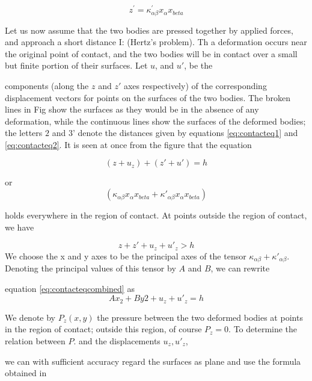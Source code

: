 \begin{equation}
z^{'} = \kappa^{'}_{\alpha\beta}x_{\alpha}x_{beta}
\label{eq:contacteq2}
\end{equation}

Let us now assume that the two bodies are pressed together by applied
forces, and approach a short distance I: (Hertz’s problem). Th a deformation occurs near the original point of contact, and the two bodies will be in contact over a small but finite portion of their surfaces. Let $u$, and $u'$, be the

components (along the $z$ and $z'$ axes respectively) of the corresponding displacement vectors for points on the surfaces of the two bodies. The broken lines in Fig show the surfaces as they would be in the absence of any deformation, while the continuous lines show the surfaces of the deformed bodies; the letters $2$ and $3’$ denote the distances given by equations \ref{eq:contacteq1}
and \ref{eq:contacteq2}. It is seen at once from the figure that the equation

\begin{equation}
(z+u_{z}) + (z'+u') = h
\end{equation}

or 
\begin{equation}
(\kappa_{\alpha\beta}x_{\alpha}x_{beta} + \kappa'_{\alpha\beta}x_{\alpha}x_{beta})
\label{eq:contacteqcombined}
\end{equation}

holds everywhere in the region of contact. At points outside the region of
contact, we have

\begin{equation}
z+z'+u_{z}+u'_{z} > h
\end{equation}
We choose the x and y axes to be the principal axes of the tensor $\kappa_{\alpha\beta}+\kappa'_{\alpha\beta}$. Denoting the principal values of this tensor by $A$ and $B$, we can rewrite


equation \ref{eq:contacteqcombined} as
\begin{equation}
Ax_{2}+By{2}+u_{z}+u'_{z} = h
\label{eq:rewriteAB}
\end{equation}

We denote by $P_{z}(x,y)$ the pressure between the two deformed bodies at points in the region of contact; outside this region, of course $P_{z} = 0$. To determine the relation between $P$. and the displacements $u_{z}, u'_{z}$,

 we can with sufficient accuracy regard the surfaces as plane and use the formula obtained in 
 
